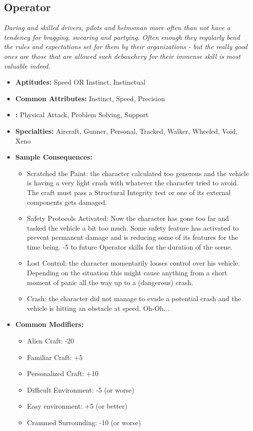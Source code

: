 	 \subsection{Operator}\label{Operator}
		 \textit{Daring and skilled drivers, pilots and helmsman more often than not have a tendency for bragging, swearing and partying.
		 Often enough they regularly bend the rules and expectations set for them by their organizations - but the really good ones are those that are allowed such debauchery for their immense skill is most valuable indeed.}
		 \begin{itemize}
		 	\item \textbf{Aptitudes:} Speed OR Instinct, Instinctual
		 	\item \textbf{Common Attributes:} Instinct, Speed, Precision
		 	\item \textbf{:} Physical Attack, Problem Solving, Support
		 	\item \textbf{Specialties:} Aircraft, Gunner, Personal, Tracked, Walker, Wheeled, Void, Xeno
		 	\item \textbf{Sample Consequences:} 
		 	\begin{itemize}
		 		\item Scratched the Paint: the character calculated too generous and the vehicle is having a very light crash with whatever the character tried to avoid. The craft must pass a Structural Integrity test or one of its external components gets damaged.
		 		\item Safety Protocols Activated: Now the character has gone too far and tasked the vehicle a bit too much. Some safety feature has activated to prevent permanent damage and is reducing some of its features for the time being. -5 to future Operator skills for the duration of the scene.
		 		\item Lost Control: the character momentarily looses control over his vehicle. Depending on the situation this might cause anything from a short moment of panic all the way up to a (dangerous) crash.
		 		\item Crash: the character did not manage to evade a potential crash and the vehicle is hitting an obstacle at speed. Oh-Oh...
		 	\end{itemize}
		 	\item \textbf{Common Modifiers:}
		 	\begin{itemize}
		 		\item Alien Craft: -20
		 		\item Familiar Craft: +5
		 		\item Personalized Craft: +10
		 		\item Difficult Environment: -5 (or worse)
		 		\item Easy environment: +5 (or better)
		 		\item Crammed Surrounding: -10 (or worse)
		 	\end{itemize}
		 \end{itemize}

